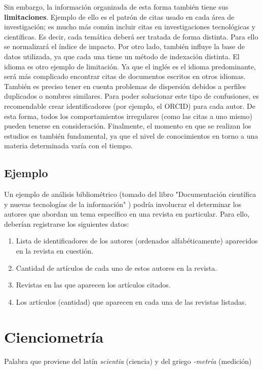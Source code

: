 Sin embargo, la información organizada de esta forma también tiene sus \textbf{limitaciones}. Ejemplo de ello es el patrón de citas usado en cada área de investigación; es mucho más común incluir citas en investigaciones tecnológicas y científicas. Es decir, cada temática deberá ser tratada de forma distinta. Para ello se normalizará el índice de impacto.
Por otro lado, también influye la base de datos utilizada, ya que cada una tiene un método de indexación distinta.
El idioma es otro ejemplo de limitación. Ya que el inglés es el idioma predominante, será más complicado encontrar citas de documentos 	escritos en otros idiomas.
También es preciso tener en cuenta problemas de dispersión debidos a perfiles duplicados o nombres similares. Para poder solucionar este tipo de confusiones, es recomendable crear identificadores (por ejemplo, el ORCID) para cada autor.
De esta forma, todos los comportamientos irregulares (como las citas a uno mismo) pueden tenerse en consideración.
Finalmente, el momento en que se realizan los estudios es también fundamental, ya que el nivel de conocimientos en torno a una materia determinada varía con el tiempo.

\subsection{Ejemplo}

Un ejemplo de análisis bibliométrico (tomado del libro "Documentación científica y nuevas tecnologías de la información" \cite{Amat1989}) podría involucrar el determinar los autores que abordan un tema específico en una revista en particular. Para ello, deberían registrarse los siguientes datos:
\begin{enumerate}
    \item Lista de identificadores de los autores (ordenados alfabéticamente) aparecidos en la revista en cuestión.
    \item Cantidad de artículos de cada uno de estos autores en la revista.
    \item Revistas en las que aparecen los artículos citados.
    \item Los artículos (cantidad) que aparecen en cada una de las revistas listadas.
\end{enumerate}


\section{Cienciometría}

Palabra que proviene del latín  \textit{scientia} (ciencia) y del griego \textit{-metría} (medición)

